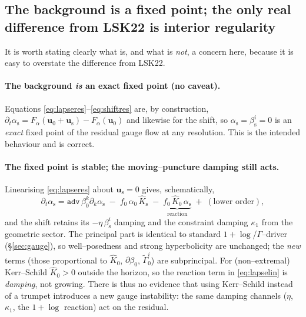 \documentclass[11pt]{article}
\newcommand{\code}[1]{\texttt{#1}}
\newcommand{\Gamt}{\tilde\Gamma}
\newcommand{\bg}[1]{#1_{0}}
\newcommand{\res}[1]{#1_{\mathrm s}}
\begin{document}
\subsection{The background is a fixed point; the only real difference from LSK22
is interior regularity}
\label{sec:gaugecaveat}
It is worth stating clearly what is, and what is \emph{not}, a concern here,
because it is easy to overstate the difference from LSK22.

\paragraph{The background \emph{is} an exact fixed point (no caveat).}
Equations \eqref{eq:lapseres}--\eqref{eq:shiftres} are, by construction,
$\partial_t\res\alpha=F_\alpha(\bg{\bm u}+\res{\bm u})-F_\alpha(\bg{\bm u})$ and
likewise for the shift, so $\res\alpha=\res\beta^i=0$ is an \emph{exact} fixed
point of the residual gauge flow at any resolution. This is the intended
behaviour and is correct.

\paragraph{The fixed point is stable; the moving--puncture damping still acts.}
Linearising \eqref{eq:lapseres} about $\res{\bm u}=0$ gives, schematically,
\begin{equation}
  \partial_t\res\alpha = \code{adv}\,\bg\beta^k\partial_k\res\alpha
     \;-\; f_0\,\bg\alpha\,\res{\hat K}
     \;-\; \underbrace{f_0\,\bg{\hat K}\,\res\alpha}_{\text{reaction}}
     \;+\;(\text{lower order}),
  \label{eq:lapselin}
\end{equation}
and the shift retains its $-\eta\,\res\beta^i$ damping and the constraint
damping $\kappa_1$ from the geometric sector. The principal part is identical to
standard $1+\log$/$\Gamma$--driver (\S\ref{sec:gauge}), so well--posedness and
strong hyperbolicity are unchanged; the \emph{new} terms (those proportional to
$\bg{\hat K}$, $\partial\bg\beta$, $\bg{\Gamt}^i$) are subprincipal. For
(non--extremal) Kerr--Schild $\bg{\hat K}>0$ outside the horizon, so the
reaction term in \eqref{eq:lapselin} is \emph{damping}, not growing. There is
thus no evidence that using Kerr--Schild instead of a trumpet introduces a new
gauge instability: the same damping channels ($\eta$, $\kappa_1$, the
$1+\log$ reaction) act on the residual.
\end{document}
